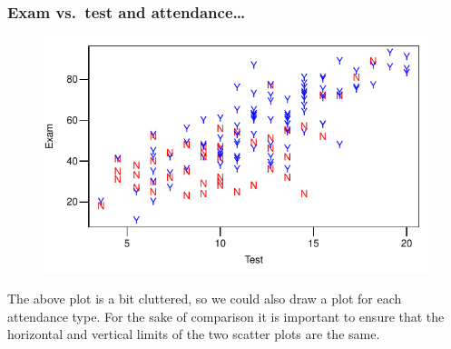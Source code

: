\documentclass{beamer}\usepackage[]{graphicx}\usepackage[]{xcolor}
\begin{document}
\begin{frame}[fragile]
\frametitle{Exam vs.\ test \textbf{and} attendance\ldots}



\begin{figure}
  \centering
  \includegraphics{figure/RC-H08-002}
\end{figure}

The above plot is a bit cluttered, so we could also draw a plot for each attendance type. For the sake of comparison it is important to ensure that the horizontal and vertical limits of the two scatter plots are the same.

\end{frame}
\end{document}
